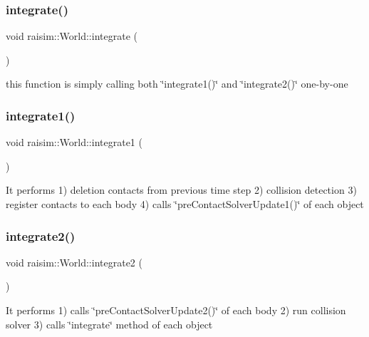 \subsubsection{\texorpdfstring{integrate()}{integrate()}}
{\footnotesize\ttfamily void raisim\+::\+World\+::integrate (\begin{DoxyParamCaption}{ }\end{DoxyParamCaption})}

this function is simply calling both \char`\"{}integrate1()\char`\"{} and \char`\"{}integrate2()\char`\"{} one-\/by-\/one \mbox{\label{classraisim_1_1World_ac24197f5e93fde3a9dad48766ef32084}} 
\subsubsection{\texorpdfstring{integrate1()}{integrate1()}}
{\footnotesize\ttfamily void raisim\+::\+World\+::integrate1 (\begin{DoxyParamCaption}{ }\end{DoxyParamCaption})}

It performs 1) deletion contacts from previous time step 2) collision detection 3) register contacts to each body 4) calls \char`\"{}pre\+Contact\+Solver\+Update1()\char`\"{} of each object \mbox{\label{classraisim_1_1World_a959490c4b2355761ad0623e971522600}} 
\subsubsection{\texorpdfstring{integrate2()}{integrate2()}}
{\footnotesize\ttfamily void raisim\+::\+World\+::integrate2 (\begin{DoxyParamCaption}{ }\end{DoxyParamCaption})}

It performs 1) calls \char`\"{}pre\+Contact\+Solver\+Update2()\char`\"{} of each body 2) run collision solver 3) calls \char`\"{}integrate\char`\"{} method of each object \mbox{\label{classraisim_1_1World_ae04b2e261ee5703145ef4113b604c77f}} 
